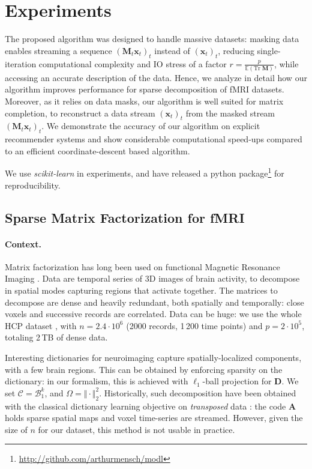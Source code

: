 \documentclass{article}
\def\E{{\mathbb E}}
\def\x{{\mathbf x}}
\def\A{{\mathbf A}}
\def\D{{\mathbf D}}
\def\x{{\mathbf x}}
\def\M{{\mathbf M}}
\def\trace{{\mathrm{Tr}\;}}
\begin{document}
\section{Experiments}

The proposed algorithm was designed to handle massive datasets:
masking data enables streaming a sequence $(\M_t \x_t)_t$ instead of
$(\x_t)_t$, reducing single-iteration computational complexity and IO stress of a factor $r = \frac{p}{\E(\trace \M)}$,
while accessing an accurate description of the data. Hence, we analyze in
detail how our algorithm improves performance for
sparse decomposition of fMRI datasets. Moreover, as it relies on data
masks, our algorithm is well suited for matrix completion,
to reconstruct a data stream $(\x_t)_t$ from the masked stream
$(\M_t \x_t)_t$.
We demonstrate the accuracy of our algorithm on explicit
recommender systems and show considerable computational speed-ups
compared to an efficient coordinate-descent based algorithm.

We use \textit{scikit-learn} \cite{pedregosa_scikit-learn:_2011} in experiments,
and have released a python package\footnote{\url{http://github.com/arthurmensch/modl}} for reproducibility.

\subsection{Sparse Matrix Factorization for fMRI}


\paragraph{Context.}Matrix factorization has long been used on
functional Magnetic Resonance Imaging \cite{mckeown_analysis_1998}. Data are
temporal series of 3D images of brain activity, to decompose in spatial modes
capturing regions that activate together. The matrices to decompose are dense
and heavily redundant, both spatially and temporally: close voxels and
successive records are correlated. Data can be huge:
we use the whole HCP dataset \cite{van_essen_wu-minn_2013}, with $n=2.4\cdot 10^6$ (2000 records, 1\,200 time points) and $p=2\cdot10^5$, totaling 2\,TB of dense
data.

Interesting dictionaries for neuroimaging capture spatially-localized
components, with a few brain regions. This can be obtained by enforcing
sparsity on the dictionary: in our formalism, this is achieved with
$\ell_1$-ball
projection for $\D$. We set $\mathcal{C} = \mathcal{B}_1^k$, and $\Omega = \Vert
\cdot\Vert_2^2$. Historically, such decomposition have been obtained
with the classical
dictionary learning objective on \textit{transposed} data
\cite{varoquaux_cohort-level_2013}: the code $\A$ holds sparse spatial
maps and voxel time-series are streamed. However, given the size of $n$ for our
dataset, this method is not usable in practice.
\end{document}
